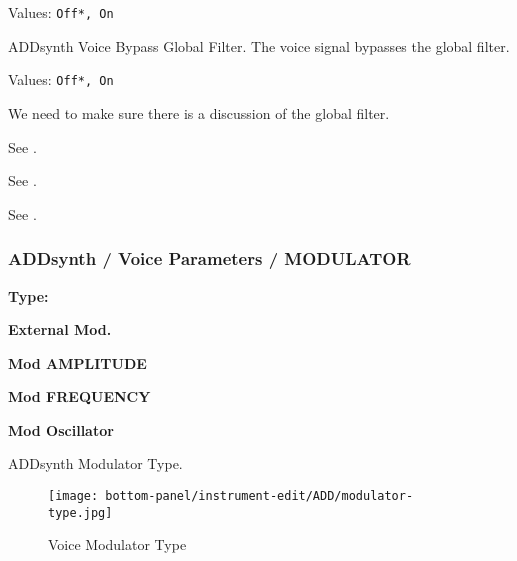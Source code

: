    Values: \texttt{Off*, On}

   ADDsynth Voice Bypass Global Filter.
   The voice signal bypasses the global filter.

   Values: \texttt{Off*, On}

   We need to make sure there is a discussion of the global filter.

   See .

   See .

   See .

\subsubsection{ADDsynth / Voice Parameters / MODULATOR}
\label{subsubsec:addsynth_voice_parameters_modulator}

   \begin{enumber}
      \item \textbf{Type:}
      \item \textbf{External Mod.}
      \item \textbf{Mod AMPLITUDE}
      \item \textbf{Mod FREQUENCY}
      \item \textbf{Mod Oscillator}
   \end{enumber}

   \setcounter{ItemCounter}{0}      %

   ADDsynth Modulator Type.

\begin{figure}[H]
   \centering 
   \texttt{[image: bottom-panel/instrument-edit/ADD/modulator-type.jpg]}
   \caption{Voice Modulator Type}
   \label{fig:voice_modulator_type}
\end{figure}

